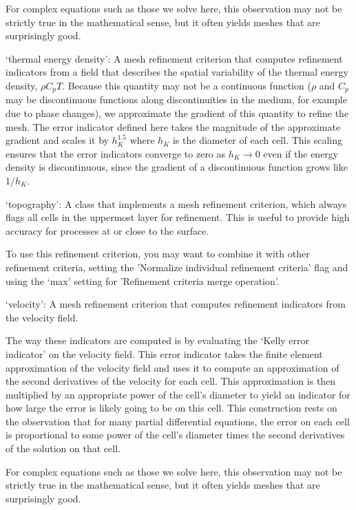 \begin{itemize}
For complex equations such as those we solve here, this observation may not be strictly true in the mathematical sense, but it often yields meshes that are surprisingly good.

`thermal energy density': A mesh refinement criterion that computes refinement indicators from a field that describes the spatial variability of the thermal energy density, $\rho C_p T$. Because this quantity may not be a continuous function ($\rho$ and $C_p$ may be discontinuous functions along discontinuities in the medium, for example due to phase changes), we approximate the gradient of this quantity to refine the mesh. The error indicator defined here takes the magnitude of the approximate gradient and scales it by $h_K^{1.5}$ where $h_K$ is the diameter of each cell. This scaling ensures that the error indicators converge to zero as $h_K\rightarrow 0$ even if the energy density is discontinuous, since the gradient of a discontinuous function grows like $1/h_K$.

`topography': A class that implements a mesh refinement criterion, which always flags all cells in the uppermost layer for refinement. This is useful to provide high accuracy for processes at or close to the surface.

To use this refinement criterion, you may want to combine it with other refinement criteria, setting the 'Normalize individual refinement criteria' flag and using the `max' setting for 'Refinement criteria merge operation'.

`velocity': A mesh refinement criterion that computes refinement indicators from the velocity field.

The way these indicators are computed is by evaluating the `Kelly error indicator' on the velocity field. This error indicator takes the finite element approximation of the velocity field and uses it to compute an approximation of the second derivatives of the velocity for each cell. This approximation is then multiplied by an appropriate power of the cell's diameter to yield an indicator for how large the error is likely going to be on this cell. This construction rests on the observation that for many partial differential equations, the error on each cell is proportional to some power of the cell's diameter times the second derivatives of the solution on that cell.

For complex equations such as those we solve here, this observation may not be strictly true in the mathematical sense, but it often yields meshes that are surprisingly good.


\end{itemize}
